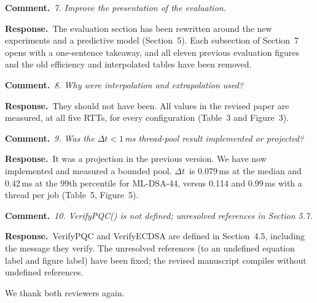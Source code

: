 \documentclass[11pt]{article}
\newcommand{\RC}[1]{\par\medskip\noindent\textcolor{rc}{\textbf{Comment.}}~\textit{#1}\par}
\newcommand{\AR}{\par\noindent\textbf{Response.}~}
\newcommand{\Dt}{\ensuremath{\Delta t}}
\begin{document}
\RC{7. Improve the presentation of the evaluation.}
\AR The evaluation section has been rewritten around the new
experiments and a predictive model (Section~5).  Each subsection of
Section~7 opens with a one-sentence takeaway, and all eleven previous
evaluation figures and the old efficiency and interpolated tables have
been removed.

\RC{8. Why were interpolation and extrapolation used?}
\AR They should not have been.  All values in the revised paper are
measured, at all five RTTs, for every configuration (Table~3 and
Figure~3).

\RC{9. Was the $\Delta t < 1$\,ms thread-pool result implemented or
projected?}
\AR It was a projection in the previous version.  We have now implemented
and measured a bounded pool.  \Dt\ is 0.079\,ms at the median and 0.42\,ms
at the 99th percentile for ML-DSA-44, versus 0.114 and 0.99\,ms with a
thread per job (Table~5, Figure~5).

\RC{10. VerifyPQC() is not defined; unresolved references in Section 5.7.}
\AR VerifyPQC and VerifyECDSA are defined in Section~4.5, including the
message they verify.  The unresolved references (to an undefined
equation label and figure label) have been fixed; the revised manuscript
compiles without undefined references.

\medskip
We thank both reviewers again.
\end{document}

